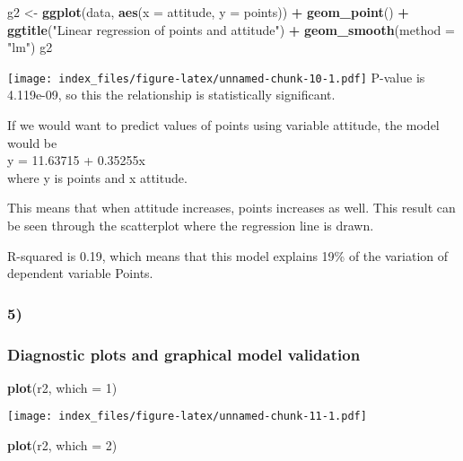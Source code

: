 \documentclass[]{article}
\newenvironment{Shaded}{\begin{snugshade}}{\end{snugshade}}
\newcommand{\KeywordTok}[1]{\textcolor[rgb]{0.13,0.29,0.53}{\textbf{#1}}}
\newcommand{\DataTypeTok}[1]{\textcolor[rgb]{0.13,0.29,0.53}{#1}}
\newcommand{\DecValTok}[1]{\textcolor[rgb]{0.00,0.00,0.81}{#1}}
\newcommand{\StringTok}[1]{\textcolor[rgb]{0.31,0.60,0.02}{#1}}
\newcommand{\OperatorTok}[1]{\textcolor[rgb]{0.81,0.36,0.00}{\textbf{#1}}}
\newcommand{\NormalTok}[1]{#1}
\begin{document}
\begin{Shaded}
\begin{Highlighting}[]
\NormalTok{g2 <-}\StringTok{ }\KeywordTok{ggplot}\NormalTok{(data, }\KeywordTok{aes}\NormalTok{(}\DataTypeTok{x =}\NormalTok{ attitude, }\DataTypeTok{y =}\NormalTok{ points)) }\OperatorTok{+}\StringTok{ }\KeywordTok{geom_point}\NormalTok{() }\OperatorTok{+}\StringTok{ }\KeywordTok{ggtitle}\NormalTok{(}\StringTok{"Linear regression of points and attitude"}\NormalTok{) }\OperatorTok{+}\StringTok{ }\KeywordTok{geom_smooth}\NormalTok{(}\DataTypeTok{method =} \StringTok{"lm"}\NormalTok{)}
\NormalTok{g2}
\end{Highlighting}
\end{Shaded}

\texttt{[image: index\_files/figure-latex/unnamed-chunk-10-1.pdf]}
P-value is 4.119e-09, so this the relationship is statistically
significant.

If we would want to predict values of points using variable attitude,
the model would be\\
y = 11.63715 + 0.35255x\\
where y is points and x attitude.

This means that when attitude increases, points increases as well. This
result can be seen through the scatterplot where the regression line is
drawn.

R-squared is 0.19, which means that this model explains 19\% of the
variation of dependent variable Points.

\subsubsection{5)}\label{section-4}

\subsubsection{Diagnostic plots and graphical model
validation}\label{diagnostic-plots-and-graphical-model-validation}

\begin{Shaded}
\begin{Highlighting}[]
\KeywordTok{plot}\NormalTok{(r2, }\DataTypeTok{which =} \DecValTok{1}\NormalTok{)}
\end{Highlighting}
\end{Shaded}

\texttt{[image: index\_files/figure-latex/unnamed-chunk-11-1.pdf]}

\begin{Shaded}
\begin{Highlighting}[]
\KeywordTok{plot}\NormalTok{(r2, }\DataTypeTok{which =} \DecValTok{2}\NormalTok{)}
\end{Highlighting}
\end{Shaded}
\end{document}
